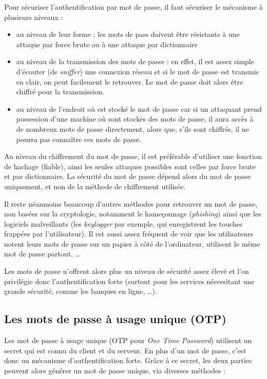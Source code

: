Pour sécuriser l'authentification par mot de passe, il faut
sécuriser le mécanisme à plusieurs niveaux :
\begin{itemize}
  \item au niveau de leur forme : les mots de pass doivent 
être résistants à une attaque par force brute ou à une attaque 
par dictionnaire
  \item au niveau de la transmission des mots de passe : en effet,
il est assez simple d'écouter (de \emph{sniffer}) une connexion
réseau et si le mot de passe est transmis en clair, on peut
facilement le retrouver. Le mot de passe doit alors être chiffré
pour la transmission.
  \item au niveau de l'endroit où est stocké le mot de passe car
si un attaquant prend possession d'une machine où sont stockés
des mots de passe, il aura accès à de nombreux mots
de passe directement, alors que, s'ils sont
chiffrés, il ne pourra pas connaître ces mots de passe.
\\
\end{itemize}

Au niveau du chiffrement du mot de passe, il est préférable
d'utiliser une fonction de hachage (fiable), ainsi les seules
attaques possibles sont celles par force brute et par
dictionnaire. La sécurité du mot de passe dépend alors du mot de
passe uniquement, et non de la méthode de chiffrement utilisée.

Il reste néanmoins beaucoup d'autres méthodes pour retrouver un mot de
passe, non basées sur la cryptologie, notamment le hameçonnage
(\emph{phishing}) ainsi que les logiciels malveillants (les
\emph{keylogger} par exemple, qui enregistrent les touches
frappées par l'utilisateur). Il est aussi assez fréquent de voir
que les utilisateurs notent leurs mots de passe sur un papier à
côté de l'ordinateur, utilisent le même mot de passe partout, …

Les mots de passe n'offrent alors plus un niveau de sécurité assez
élevé et l'on privilégie donc l'authentification forte (surtout
pour les services nécessitant une grande sécurité, comme les
banques en ligne, …).

\subsection{Les mots de passe à usage unique (OTP)}
Les mot de passe à usage unique (OTP pour \emph{One Time
Password}) utilisent un secret qui est connu du client et du
serveur. En plus d'un mot de passe, c'est donc un mécanisme
d'authentification forte.
Grâce à ce secret, les deux parties peuvent alors générer
un mot de passe unique, via diverses méthodes : 

